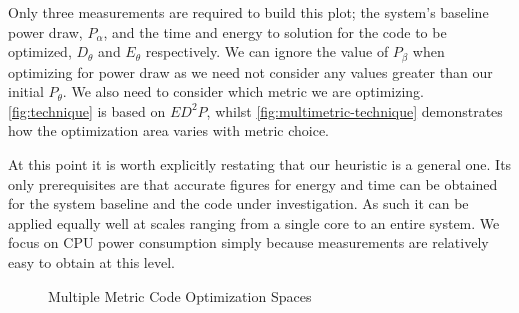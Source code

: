 Only three measurements are required to build this plot; the system's baseline power draw, $P_\alpha$, and the time and energy to solution for the code to be optimized, $D_\theta$ and $E_\theta$ respectively. We can ignore the value of $P_\beta$ when optimizing for power draw as we need not consider any values greater than our initial $P_\theta$. We also need to consider which metric we are optimizing. \autoref{fig:technique} is based on $ED^2P$, whilst \autoref{fig:multimetric-technique} demonstrates how the optimization area varies with metric choice.

At this point it is worth explicitly restating that our heuristic is a general one. Its only prerequisites are that accurate figures for energy and time can be obtained for the system baseline and the code under investigation. As such it can be applied equally well at scales ranging from a single core to an entire system. We focus on CPU power consumption simply because measurements are relatively easy to obtain at this level.

\begin{figure}
\centering

\caption{Multiple Metric Code Optimization Spaces}
\label{fig:multimetric-technique}
\end{figure}
